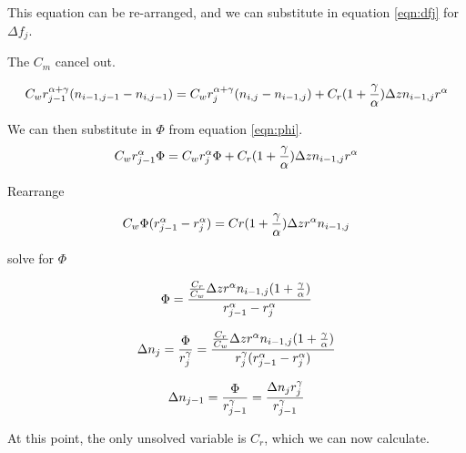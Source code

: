\documentclass[a4paper,12pt]{article}
\begin{document}
This equation can be re-arranged, and we can substitute in equation \ref{eqn:dfj} for $\Delta f_j$. 
 

The $C_m$ cancel out.

\begin{equation}
 C_w r_{j-1} ^{\alpha + \gamma} (n_{i-1,j-1}- n_{i,j-1}) = 
 C_w r_{j}^{\alpha + \gamma} (n_{i,j} - n_{i-1,j}) +  C_r  (1 + {\gamma \over \alpha}) \Delta z n_{i-1,j} r ^ \alpha
\end{equation}

We can then substitute in $\Phi$ from equation \ref{eqn:phi}.
\begin{equation}
C_w r_{j-1} ^{\alpha} \Phi = 
 C_w r_{j}^{\alpha} \Phi +  C_r  (1 + {\gamma \over \alpha}) \Delta z n_{i-1,j} r ^ \alpha
\end{equation}


Rearrange

\begin{equation}
C_w\Phi(r_{j-1}^\alpha - r_j^\alpha) = Cr(1 + {\gamma \over \alpha}) \Delta z r^{\alpha} n_{i-1,j}
\end{equation}

solve for $\Phi$

\begin{equation}
\Phi = {{{C_r \over C_w} \Delta z r^{\alpha} n_{i-1,j}(1 + {\gamma \over \alpha})} \over {r_{j-1}^\alpha - r_j^\alpha}}
\end{equation}

\begin{equation}
\Delta n_j = {\Phi \over r_j^\gamma} = {{{C_r \over C_w} \Delta z r^{\alpha} n_{i-1,j}(1 + {\gamma \over \alpha})} \over {r_j^\gamma(r_{j-1}^\alpha - r_j^\alpha})}
\label{eqn:dnj}
\end{equation}

\begin{equation}
\Delta n_{j-1} = {\Phi \over r_{j-1}^\gamma} = {{\Delta n_j r_j^\gamma} \over {r_{j-1}^\gamma}}
\end{equation}

At this point, the only unsolved variable is $C_r$, which we can now calculate.
\end{document}

